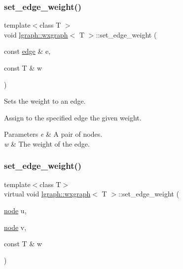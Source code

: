 \mbox{\label{classlgraph_1_1wxgraph_a9779e7b5d0a767d4b3c61a7c9a4c2449}} 
\subsubsection{\texorpdfstring{set\+\_\+edge\+\_\+weight()}{set\_edge\_weight()}\hspace{0.1cm}{\footnotesize\ttfamily [1/2]}}
{\footnotesize\ttfamily template$<$class T $>$ \\
void \hyperlink{classlgraph_1_1wxgraph}{lgraph\+::wxgraph}$<$ T $>$\+::set\+\_\+edge\+\_\+weight (\begin{DoxyParamCaption}\item[{const \hyperlink{namespacelgraph_a76bd7d50719f03de7a85db259d80d572}{edge} \&}]{e,  }\item[{const T \&}]{w }\end{DoxyParamCaption})}



Sets the weight to an edge. 

Assign to the specified edge the given weight.


\begin{DoxyParams}{Parameters}
{\em e} & A pair of nodes. \\
\hline
{\em w} & The weight of the edge. \\
\hline
\end{DoxyParams}
\mbox{\label{classlgraph_1_1wxgraph_a463761d3fee15f119f214bb90c63dec2}} 
\subsubsection{\texorpdfstring{set\+\_\+edge\+\_\+weight()}{set\_edge\_weight()}\hspace{0.1cm}{\footnotesize\ttfamily [2/2]}}
{\footnotesize\ttfamily template$<$class T$>$ \\
virtual void \hyperlink{classlgraph_1_1wxgraph}{lgraph\+::wxgraph}$<$ T $>$\+::set\+\_\+edge\+\_\+weight (\begin{DoxyParamCaption}\item[{\hyperlink{namespacelgraph_a397169dd66adf725210a30fb7251773e}{node}}]{u,  }\item[{\hyperlink{namespacelgraph_a397169dd66adf725210a30fb7251773e}{node}}]{v,  }\item[{const T \&}]{w }\end{DoxyParamCaption})\hspace{0.3cm}{\ttfamily [pure virtual]}}



